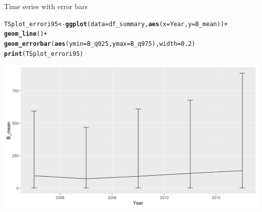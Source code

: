 \documentclass{beamer}\usepackage[]{graphicx}\usepackage[]{color}
\makeatletter
\newcommand{\hlnum}[1]{\textcolor[rgb]{0.686,0.059,0.569}{#1}}%
\newcommand{\hlopt}[1]{\textcolor[rgb]{0,0,0}{#1}}%
\newcommand{\hlstd}[1]{\textcolor[rgb]{0.345,0.345,0.345}{#1}}%
\newcommand{\hlkwb}[1]{\textcolor[rgb]{0.69,0.353,0.396}{#1}}%
\newcommand{\hlkwc}[1]{\textcolor[rgb]{0.333,0.667,0.333}{#1}}%
\newcommand{\hlkwd}[1]{\textcolor[rgb]{0.737,0.353,0.396}{\textbf{#1}}}%
\newenvironment{kframe}{%
 \def\at@end@of@kframe{}%
 \ifinner\ifhmode%
  \def\at@end@of@kframe{\end{minipage}}%
  \begin{minipage}{\columnwidth}%
 \fi\fi%
 \def\FrameCommand##1{\hskip\@totalleftmargin \hskip-\fboxsep
 \colorbox{shadecolor}{##1}\hskip-\fboxsep
     \hskip-\linewidth \hskip-\@totalleftmargin \hskip\columnwidth}%
 \MakeFramed {\advance\hsize-\width
   \@totalleftmargin\z@ \linewidth\hsize
   \@setminipage}}%
 {\par\unskip\endMakeFramed%
 \at@end@of@kframe}
\newenvironment{knitrout}{}{} %
\makeatother
\begin{document}
\begin{frame}[fragile]{Time series with error bars}
\begin{knitrout}\footnotesize
{}\color{fgcolor}\begin{kframe}
\begin{alltt}
\hlstd{TSplot_errori95} \hlkwb{<-} \hlkwd{ggplot}\hlstd{(}\hlkwc{data}\hlstd{=df_summary,} \hlkwd{aes}\hlstd{(}\hlkwc{x}\hlstd{=Year,} \hlkwc{y}\hlstd{=B_mean))} \hlopt{+}
  \hlkwd{geom_line}\hlstd{()} \hlopt{+}
  \hlkwd{geom_errorbar}\hlstd{(}\hlkwd{aes}\hlstd{(}\hlkwc{ymin} \hlstd{= B_q025,} \hlkwc{ymax} \hlstd{= B_q975),} \hlkwc{width} \hlstd{=} \hlnum{0.2}\hlstd{)}
\hlkwd{print}\hlstd{(TSplot_errori95)}
\end{alltt}
\end{kframe}

{\centering \includegraphics[width=.9\linewidth]{figure/sp_TSplot_errori95-1} 

}



\end{knitrout}
\end{frame}
\end{document}
